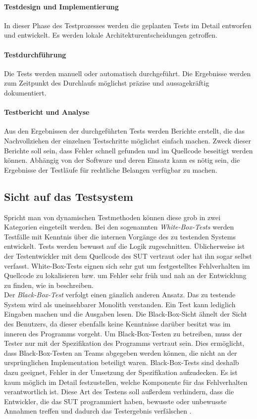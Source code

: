 \paragraph{Testdesign und Implementierung} In dieser Phase des Testprozesses werden die geplanten Tests im Detail entworfen und entwickelt. Es werden lokale Architekturentscheidungen getroffen.

\paragraph{Testdurchführung} Die Tests werden manuell oder automatisch durchgeführt. Die Ergebnisse werden zum Zeitpunkt des Durchlaufs möglichst präzise und aussagekräftig dokumentiert.

\paragraph{Testbericht und Analyse} Aus den Ergebnissen der durchgeführten Tests werden Berichte erstellt, die das Nachvollziehen der einzelnen Testschritte möglichst einfach machen. Zweck dieser Berichte soll sein, dass Fehler schnell gefunden und im Quellcode beseitigt werden können. Abhängig von der Software und deren Einsatz kann es nötig sein, die Ergebnisse der Testläufe für rechtliche Belangen verfügbar zu machen.

\subsection{Sicht auf das Testsystem}
\label{sec:sicht}
Spricht man von dynamischen Testmethoden können diese grob in zwei Kategorien eingeteilt werden. Bei den sogenannten \textit{White-Box-Tests} werden Testfälle mit Kenntnis über die internen Vorgänge des zu testenden Systems entwickelt. Tests werden bewusst auf die Logik zugeschnitten. Üblicherweise ist der Testentwickler mit dem Quellcode des \gls{SUT} vertraut oder hat ihn sogar selbst verfasst. White-Box-Tests eignen sich sehr gut um festgestelltes Fehlverhalten im Quellcode zu lokalisieren bzw. um Fehler sehr früh und nah an der Entwicklung zu finden, wie \citeauthor{spillner_basiswissen_2012} in \cite{spillner_basiswissen_2012} beschreiben.\\
Der \textit{Black-Box-Test} verfolgt einen gänzlich anderen Ansatz. Das zu testende System wird als uneinsehbarer Monolith verstanden. Ein Test kann lediglich Eingaben machen und die Ausgaben lesen. Die Black-Box-Sicht ähnelt der Sicht des Benutzers, da dieser ebenfalls keine Kenntnisse darüber besitzt was im inneren des Programms vorgeht. Um Black-Box-Testen zu betreiben, muss der Tester nur mit der Spezifikation des Programms vertraut sein. Dies ermöglicht, dass Black-Box-Testen an Teams abgegeben werden können, die nicht an der ursprünglichen Implementation beteiligt waren. Black-Box-Tests sind deshalb dazu geeignet, Fehler in der Umsetzung der Spezifikation aufzudecken. Es ist kaum möglich im Detail festzustellen, welche Komponente für das Fehlverhalten verantwortlich ist. Diese Art des Testens soll außerdem verhindern, dass die Entwickler, die das \gls{SUT} programmiert haben, bewusste oder unbewusste Annahmen treffen und dadurch das Testergebnis verfälschen \cite{spillner_basiswissen_2012}.  

